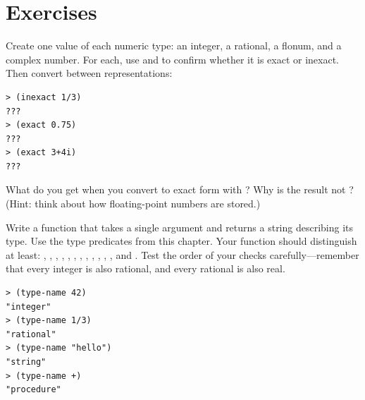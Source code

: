 \section*{Exercises}

\begin{exercise}
Create one value of each numeric type: an integer, a rational, a flonum, and a complex number. For each, use  and  to confirm whether it is exact or inexact. Then convert between representations:

\begin{lstlisting}[style=repl]
> (inexact 1/3)
???
> (exact 0.75)
???
> (exact 3+4i)
???
\end{lstlisting}

What do you get when you convert  to exact form with ? Why is the result not ? (Hint: think about how floating-point numbers are stored.)
\end{exercise}

\begin{exercise}
Write a function  that takes a single argument and returns a string describing its type. Use the type predicates from this chapter. Your function should distinguish at least: , , , , , , , , , , , , and . Test the order of your checks carefully---remember that every integer is also rational, and every rational is also real.

\begin{lstlisting}[style=repl]
> (type-name 42)
"integer"
> (type-name 1/3)
"rational"
> (type-name "hello")
"string"
> (type-name +)
"procedure"
\end{lstlisting}
\end{exercise}

